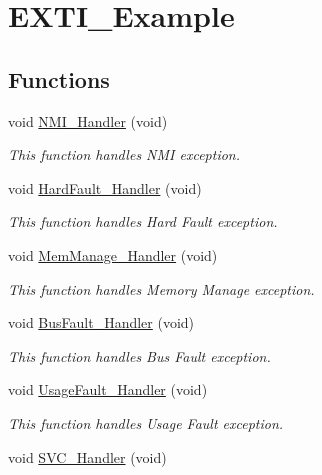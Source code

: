 \hypertarget{group___e_x_t_i___example}{\section{E\-X\-T\-I\-\_\-\-Example}
\label{group___e_x_t_i___example}
}
\subsection*{Functions}
\begin{DoxyCompactItemize}
\item 
void \hyperlink{group___e_x_t_i___example_ga6ad7a5e3ee69cb6db6a6b9111ba898bc}{N\-M\-I\-\_\-\-Handler} (void)
\begin{DoxyCompactList}\small\item\em This function handles N\-M\-I exception. \end{DoxyCompactList}\item 
void \hyperlink{group___e_x_t_i___example_ga2bffc10d5bd4106753b7c30e86903bea}{Hard\-Fault\-\_\-\-Handler} (void)
\begin{DoxyCompactList}\small\item\em This function handles Hard Fault exception. \end{DoxyCompactList}\item 
void \hyperlink{group___e_x_t_i___example_ga3150f74512510287a942624aa9b44cc5}{Mem\-Manage\-\_\-\-Handler} (void)
\begin{DoxyCompactList}\small\item\em This function handles Memory Manage exception. \end{DoxyCompactList}\item 
void \hyperlink{group___e_x_t_i___example_ga850cefb17a977292ae5eb4cafa9976c3}{Bus\-Fault\-\_\-\-Handler} (void)
\begin{DoxyCompactList}\small\item\em This function handles Bus Fault exception. \end{DoxyCompactList}\item 
void \hyperlink{group___e_x_t_i___example_ga1d98923de2ed6b7309b66f9ba2971647}{Usage\-Fault\-\_\-\-Handler} (void)
\begin{DoxyCompactList}\small\item\em This function handles Usage Fault exception. \end{DoxyCompactList}\item 
void \hyperlink{group___e_x_t_i___example_ga3e5ddb3df0d62f2dc357e64a3f04a6ce}{S\-V\-C\-\_\-\-Handler} (void)

\end{DoxyCompactItemize}
